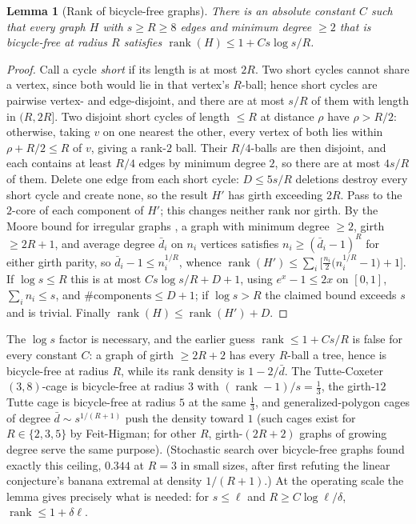 \documentclass[11pt]{article}
\newtheorem{lemma}{Lemma}
\theoremstyle{remark}
\begin{document}
\begin{lemma}[Rank of bicycle-free graphs]\label{lem:rank}
There is an absolute constant $C$ such that every graph $H$ with
$s\ge R\ge8$ edges and minimum degree $\ge2$ that is bicycle-free at
radius $R$ satisfies
$\operatorname{rank}(H)\le1+Cs\log s/R$.
\end{lemma}

\begin{proof}
Call a cycle \emph{short} if its length is at most $2R$. Two short
cycles cannot share a vertex, since both would lie in that vertex's
$R$-ball; hence short cycles are pairwise vertex- and edge-disjoint,
and there are at most $s/R$ of them with length in $(R,2R]$. Two
disjoint short cycles of length $\le R$ at distance $\rho$ have
$\rho>R/2$: otherwise, taking $v$ on one nearest the other, every
vertex of both lies within $\rho+R/2\le R$ of $v$, giving a rank-$2$
ball. Their $R/4$-balls are then disjoint, and each contains at least
$R/4$ edges by minimum degree $2$, so there are at most $4s/R$ of
them. Delete one edge from each short cycle: $D\le5s/R$ deletions
destroy every short cycle and create none, so the result $H'$ has
girth exceeding $2R$. Pass to the $2$-core of each component of $H'$;
this changes neither rank nor girth. By the Moore bound for irregular
graphs \cite{ahl02}, a graph with minimum degree $\ge2$, girth
$\ge2R+1$, and average degree $\bar d_i$ on $n_i$ vertices satisfies
$n_i\ge(\bar d_i-1)^{R}$ for either girth parity, so
$\bar d_i-1\le n_i^{1/R}$, whence
$\operatorname{rank}(H')\le\sum_i\big[\tfrac{n_i}2\big(n_i^{1/R}-1\big)+1\big]$.
If $\log s\le R$ this is at most $Cs\log s/R+D+1$, using
$e^{x}-1\le2x$ on $[0,1]$, $\sum_in_i\le s$, and
$\#\mathrm{components}\le D+1$; if $\log s>R$ the claimed bound
exceeds $s$ and is trivial. Finally
$\operatorname{rank}(H)\le\operatorname{rank}(H')+D$.
\end{proof}

The $\log s$ factor is necessary, and the earlier guess
$\operatorname{rank}\le1+Cs/R$ is false for every constant $C$: a
graph of girth $\ge2R+2$ has every $R$-ball a tree, hence is
bicycle-free at radius $R$, while its rank density is $1-2/\bar d$.
The Tutte-Coxeter $(3,8)$-cage is bicycle-free at radius $3$ with
$(\operatorname{rank}-1)/s=\tfrac13$, the girth-$12$ Tutte cage is
bicycle-free at radius $5$ at the same $\tfrac13$, and
generalized-polygon cages of degree $\bar d\sim s^{1/(R+1)}$ push the
density toward $1$ (such cages exist for $R\in\{2,3,5\}$ by
Feit-Higman; for other $R$, girth-$(2R+2)$ graphs of growing degree
serve the same purpose). (Stochastic search over bicycle-free
graphs found exactly this ceiling, $0.344$ at $R=3$ in small sizes,
after first refuting the linear conjecture's banana extremal at
density $1/(R+1)$.) At the operating scale the lemma gives precisely
what is needed: for $s\le\ell$ and $R\ge C\log\ell/\delta$,
$\operatorname{rank}\le1+\delta\ell$.
\end{document}
